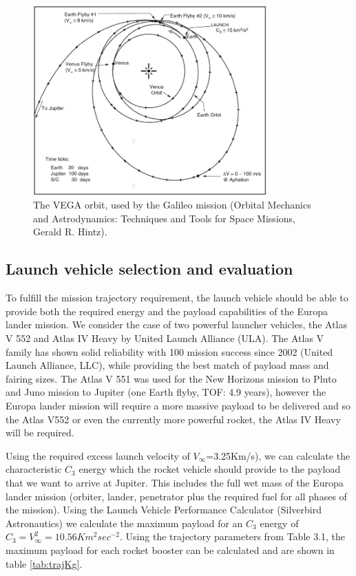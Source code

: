 \begin{figure}[htb!]
\centering
\includegraphics[width=0.8\textwidth]{figures/Orbiter/VEEGA.png}
\caption{The  VEGA orbit, used by the Galileo mission (Orbital Mechanics and Astrodynamics: Techniques and Tools for Space Missions, Gerald R. Hintz).}
\end{figure}
\subsection{Launch vehicle selection and evaluation}
To fulfill the mission trajectory requirement, the launch vehicle should be able to provide both the required energy and the payload capabilities of the Europa lander mission. We consider the case of two powerful launcher vehicles, the Atlas V 552 and Atlas IV Heavy by United Launch Alliance (ULA). The Atlas V family has shown solid reliability with 100 mission success since 2002 (United Launch Alliance, LLC), while providing the best match of payload mass and fairing sizes. The Atlas V 551 was used for the New Horizons mission to Pluto and Juno mission to Jupiter (one Earth flyby, TOF: 4.9 years), however the Europa lander mission will require a more massive payload to be delivered and so the Atlas V552 or even the currently more powerful rocket, the Atlas IV Heavy will be required. 

Using the required excess launch velocity of  $V_{\infty}$=3.25Km/s), we can calculate the characteristic $C_3$ energy which the rocket vehicle should provide to the payload that we want to arrive at Jupiter. This includes the full wet mass of the Europa lander mission (orbiter, lander, penetrator plus the required fuel for all phases of the mission). Using the Launch Vehicle Performance Calculator (Silverbird Astronautics) 
we calculate the maximum payload for an $C_3$ energy of $C_{3}=V_{\infty}^{2}=10.56 Km^2sec^{-2}$. Using the trajectory parameters from Table 3.1, the maximum payload for each rocket booster can be calculated and are shown in table \ref{tab:trajKg}.

